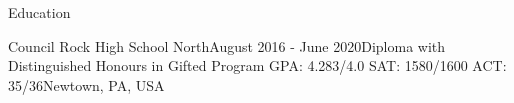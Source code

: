 \documentclass[UTF8]{resume} %
\begin{document}
\begin{rSection}{Education}
\begin{rSubsection}{Council Rock High School North}{August 2016 - June 2020}{Diploma with Distinguished Honours in Gifted Program GPA: 4.283/4.0  SAT: 1580/1600  ACT: 35/36}{Newtown, PA, USA}
        \end{rSubsection}

\end{rSection}
\end{document}

